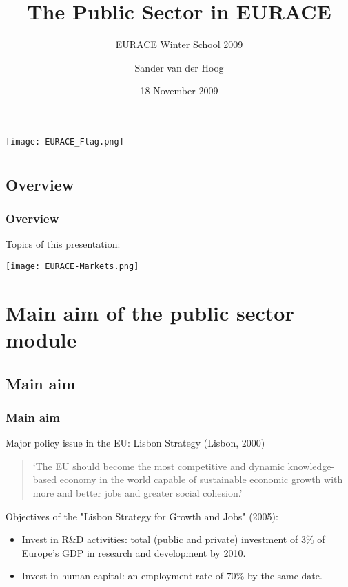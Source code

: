 \documentclass{beamer}
\title{The Public Sector in EURACE}
\subtitle[EURACE WS '09]{EURACE Winter School 2009}
\author{Sander van der Hoog}
\institute{GREQAM, Universit\'{e} de la M\'{e}diterran\'{e}e Aix-Marseille II}
\date{18 November 2009}
\begin{document}
\begin{frame}{}
\thispagestyle{empty}
\centering
\texttt{[image: EURACE\_Flag.png]}
\titlepage
\end{frame}

\section{}
\subsection{Overview}
\begin{frame}{}
\frametitle{Overview}
Topics of this presentation:
\tableofcontents
\end{frame}

\begin{frame}{}
\centering
\texttt{[image: EURACE-Markets.png]}
\end{frame}

\section{Main aim of the public sector module}
\subsection{Main aim}
\begin{frame}{}
\frametitle{Main aim}
Major policy issue in the EU: Lisbon Strategy (Lisbon, 2000)
\begin{quote}
`The EU should become the most competitive and dynamic knowledge-based economy in the world capable of sustainable economic growth with more and better jobs and greater social cohesion.'
\end{quote}

\smallskip
Objectives of the "Lisbon Strategy for Growth and Jobs" (2005):
\begin{itemize}
\item Invest in R\&D activities: total (public and private) investment of $3\%$ of Europe's GDP in research and development by 2010.
\item Invest in human capital: an employment rate of $70\%$ by the same date.
\end{itemize}
\end{frame}
\end{document}
